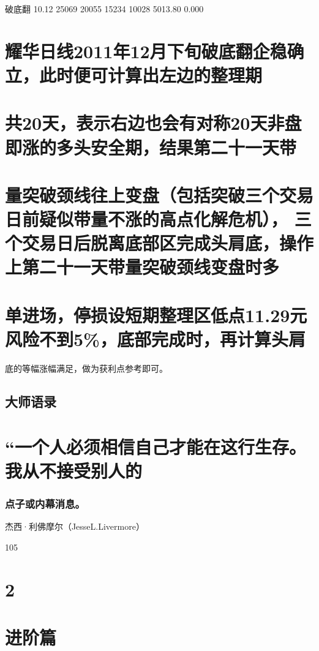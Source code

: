 \documentclass{article}
\begin{document}
破底翻 10.12 25069 20055 15234 10028 5013.80 0.000

\section{耀华日线2011年12月下旬破底翻企稳确立，此时便可计算出左边的整理期}

\section{共20天，表示右边也会有对称20天非盘即涨的多头安全期，结果第二十一天带}

\section{量突破颈线往上变盘（包括突破三个交易日前疑似带量不涨的高点化解危机）， 三个交易日后脱离底部区完成头肩底，操作上第二十一天带量突破颈线变盘时多}

\section{单进场，停损设短期整理区低点11.29元风险不到5\%，底部完成时，再计算头肩}

底的等幅涨幅满足，做为获利点参考即可。

\subsection{大师语录}

\section{“一个人必须相信自己才能在这行生存。我从不接受别人的}

\subsubsection{点子或内幕消息。}

杰西·利佛摩尔（JesseL.Livermore）

105

\clearpage

\section{2}

\section{进阶篇}
\end{document}
